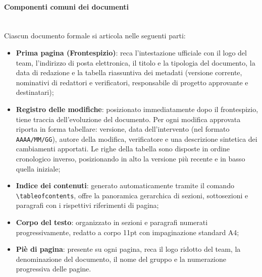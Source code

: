 \paragraph{Componenti comuni dei documenti}~\\[0.15cm]
Ciascun documento formale si articola nelle seguenti parti:
\begin{itemize}
    \item \textbf{Prima pagina (Frontespizio)}: reca l'intestazione ufficiale con il logo del team, l'indirizzo di posta elettronica, il titolo e la tipologia del documento, la data di redazione e la tabella riassuntiva dei metadati (versione corrente, nominativi di redattori e verificatori, responsabile di progetto approvante e destinatari);
    \item \textbf{Registro delle modifiche}: posizionato immediatamente dopo il frontespizio, tiene traccia dell'evoluzione del documento. Per ogni modifica approvata riporta in forma tabellare: versione, data dell'intervento (nel formato \texttt{AAAA/MM/GG}), autore della modifica, verificatore e una descrizione sintetica dei cambiamenti apportati. Le righe della tabella sono disposte in ordine cronologico inverso, posizionando in alto la versione più recente e in basso quella iniziale;
    \item \textbf{Indice dei contenuti}: generato automaticamente tramite il comando \texttt{\textbackslash tableofcontents}, offre la panoramica gerarchica di sezioni, sottosezioni e paragrafi con i rispettivi riferimenti di pagina;
    \item \textbf{Corpo del testo}: organizzato in sezioni e paragrafi numerati progressivamente, redatto a corpo 11pt con impaginazione standard A4;
    \item \textbf{Piè di pagina}: presente su ogni pagina, reca il logo ridotto del team, la denominazione del documento, il nome del gruppo e la numerazione progressiva delle pagine.
\end{itemize}

